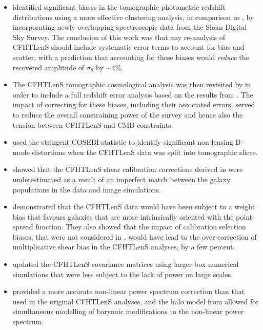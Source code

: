 \begin{itemize}
%
 \item{\citet{2016MNRAS.463.3737C} identified significant biases in the tomographic
photometric redshift distributions using a more effective clustering analysis,
in comparison to \citet{CFHTLenS-2pt-tomo}, by incorporating newly overlapping
spectroscopic data from the Sloan Digital Sky Survey.  The conclusion of this
work was that any re-analysis of CFHTLenS should include systematic error terms
to account for bias and scatter, with a prediction that accounting for these
biases would {\it reduce} the recovered amplitude of $\sigma_8$ by $\sim
4$\%.}
%
\item{The CFHTLenS tomographic cosmological analysis was then revisited by
\citet{joudaki/etal:2016} in order to include a full redshift error analysis
based on the results from \citet{2016MNRAS.463.3737C}.  The impact of
correcting for these biases, including their associated errors, served to
reduce the overall constraining power of the survey and hence also the tension
between CFHTLenS and CMB constraints.}
%
 \item{\cite{asgari/etal:2017} used the stringent COSEBI statistic
\citep{COSEBIs} to identify significant non-lensing B-mode distortions when the
CFHTLenS data was split into tomographic slices.}
%
\item{\citet{2015MNRAS.454.3500K} showed that the CFHTLenS shear calibration
corrections derived in \citet{CFHTLenS-shapes} were underestimated as a result
of an imperfect match between the galaxy populations in the data and image
simulations.}
%
\item{\citet{2016arXiv160605337F} demonstrated that the CFHTLenS data would
have been subject to a weight bias that favours galaxies that are more
intrinsically oriented with the point-spread function.  They also showed that
the impact of calibration selection biases, that were not considered in
\citet{CFHTLenS-shapes}, would have lead to the over-correction of
multiplicative shear bias in the CFHTLenS analyses, by a few percent.}
%
\item{\citet{joudaki/etal:2016} updated the CFHTLenS covariance matrices using
larger-box numerical simulations that were less subject to the lack of power on
large scales.}
%
\item{\cite{2012ApJ...761..152T} provided a more accurate non-linear power
spectrum correction than that used in the original CFHTLenS analyses, and the
halo model from \cite{2015MNRAS.454.1958M} allowed for simultaneous modelling
of baryonic modifications to the non-linear power spectrum.} 
%
\end{itemize}
